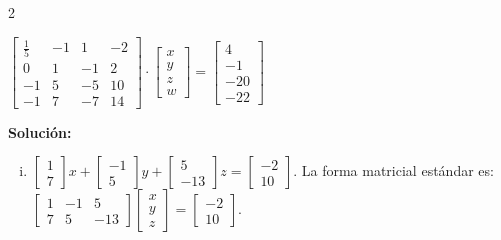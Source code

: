 \documentclass[11pt]{article}
\newcommand{\z}{\mathbb{Z}}
\newcommand{\w}{\mathbb{W}}
\begin{document}
\begin{enumerate}[\hspace{-5mm} 1) ]
\begin{enumerate}[i) ]
\begin{multicols}{2}
    \item $\begin{bmatrix}\tfrac{1}{5} & -1 & 1 & -2\\
0 & 1 & -1 & 2\\
-1 & 5 & -5 & 10\\
-1 & 7 & -7 & 14\end{bmatrix} \cdot 
\begin{bmatrix} x\\y\\z\\w \end{bmatrix}
= 
\begin{bmatrix}
    4 \\-1 \\ -20 \\-22
\end{bmatrix}
$ 
\, \\    
\end{multicols}
    
\end{enumerate}





{\bf Solución:}


\begin{enumerate}[i) ] 
    \item $\begin{bmatrix} 1 \\ 7 \end{bmatrix} x + \begin{bmatrix} -1 \\ 5 \end{bmatrix} y + \begin{bmatrix} 5 \\ -13 \end{bmatrix} z = \begin{bmatrix} -2 \\ 10 \end{bmatrix}
    $. La forma matricial estándar es:\quad $
\begin{bmatrix}
1 & -1 & 5 \\
7 & 5 & -13
\end{bmatrix}
\begin{bmatrix}
x \\ y \\ z
\end{bmatrix}
=
\begin{bmatrix}
-2 \\ 10
\end{bmatrix}.
$    


\end{enumerate}
\end{enumerate}
\end{document}
